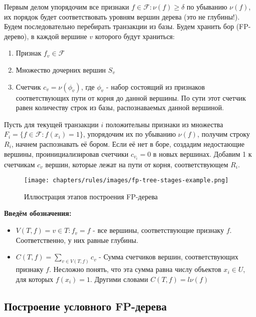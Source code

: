 Первым делом упорядочим все признаки $f \in \mathcal{F}: \nu(f) \geq \delta$ по убыванию $\nu(f)$, их порядок будет соответствовать уровням вершин дерева (это не глубины!). Будем последовательно перебирать транзакции из базы. Будем хранить бор (FP-дерево), в каждой вершине $v$ которого будут храниться: 
\begin{enumerate}
    \item Признак $f_v \in \mathcal{F}$
    \item Множество дочерних вершин $S_v$
    \item Счетчик $c_v = \nu(\phi_v)$, где $\phi_v$ - набор состоящий из признаков соответствующих пути от корня до данной вершины. По сути этот счетчик равен количеству строк из базы, распознаваемых данной вершиной.
\end{enumerate}

Пусть для текущей транзакции $i$ положительны признаки из множества $F_i = \{f \in \mathcal{F}: f(x_i) = 1 \}$, упорядочим их по убыванию $\nu(f)$, получим строку $R_i$, начнем распознавать её бором. Если её нет в боре, создадим недостающие вершины, проинициализировав счетчики $c_{v_i} = 0$ в новых вершинах. Добавим 1 к счетчикам $c_v$ вершин, которые лежат на пути от корня, соответствующем $R_i$.

\begin{figure}[h]
    \centering
    \texttt{[image: chapters/rules/images/fp-tree-stages-example.png]}
    \caption{Иллюстрация этапов построения FP-дерева}
    \label{fig:enter-label}
\end{figure}

\textbf{Введём обозначения:}

\begin{itemize}
    \item $V(T, f) = {v \in T: f_v = f}$ - все вершины, соответствующие признаку $f$. Соответственно, у них равные глубины.
    \item $C(T, f) = \displaystyle\sum_{v \in V(T, f)} c_v$ - Сумма счетчиков вершин, соответствующих признаку $f$. Несложно понять, что эта сумма равна числу объектов $x_i \in U$, для которых $f(x_i) = 1$. Другими словами $C(T, f) = l\nu(f)$
\end{itemize}


\subsection{Построение условного FP-дерева}


